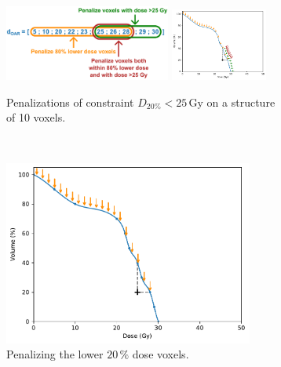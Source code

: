 \begin{figure}
	\centering
	\begin{subfigure}{\textwidth}
		\includegraphics[width=0.6\textwidth]{constraint_penalization.pdf}
		\hfill
		\includegraphics[width=0.35\textwidth]{constraint_penalization_plot.pdf}
		\caption{Penalizations of constraint $D_{20\%}< 25\,\text{Gy}$ on a structure of 10 voxels.}
		\label{fig:constraint_penalization_diagram}
	\end{subfigure}
	\\\vspace{3mm}
	\begin{subfigure}{0.32\textwidth}
		\centering
		\includegraphics[width=0.9\textwidth]{constraint_penalization_plot_1.pdf}
		\caption{Penalizing the lower $20\,\%$ dose voxels.}
		\label{fig:constraint_penalization_plot_1}
	\end{subfigure}
	\begin{subfigure}{0.32\textwidth}
		\centering

\end{subfigure}
\end{figure}
